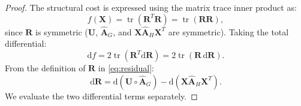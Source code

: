 \documentclass[conference]{IEEEtran}
\begin{document}
\begin{proof}
The structural cost is expressed using the matrix trace inner product as:
\begin{equation}
f(\mathbf{X}) = \operatorname{tr}(\mathbf{R}^T \mathbf{R}) = \operatorname{tr}(\mathbf{R}\mathbf{R}),
\end{equation}
since $\mathbf{R}$ is symmetric ($\mathbf{U}$, $\hat{\mathbf{A}}_G$, and $\mathbf{X}\hat{\mathbf{A}}_H\mathbf{X}^T$ are symmetric). Taking the total differential:
\begin{equation}
\mathrm{d}f = 2\operatorname{tr}(\mathbf{R}^T \mathrm{d}\mathbf{R}) = 2\operatorname{tr}(\mathbf{R} \, \mathrm{d}\mathbf{R}).
\label{eq:df_trace}
\end{equation}
From the definition of $\mathbf{R}$ in \eqref{eq:residual}:
\begin{equation}
\mathrm{d}\mathbf{R} = \mathrm{d}(\mathbf{U} \circ \hat{\mathbf{A}}_G) - \mathrm{d}(\mathbf{X}\hat{\mathbf{A}}_H\mathbf{X}^T).
\label{eq:dR}
\end{equation}
We evaluate the two differential terms separately.


\end{proof}
\end{document}
